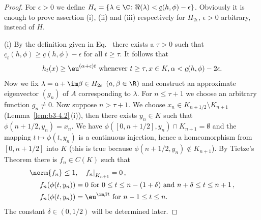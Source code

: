 \begin{proof}
	For $\epsilon > 0$ we define $H_{\epsilon} = \{\lambda \in \C \colon \Re(\lambda) < \underline{c}(h,\phi)-\epsilon\}$.
	Obviously it is enough to prove assertion (i), (ii) and (iii) respectively for $H_{2\epsilon}$, $\epsilon> 0$ arbitrary, instead of\/ $H$.

	(i) By the definition given in Eq.~ there exists a $\tau > 0$ such that $\underline{c}_{t}(h,\phi) \geq \underline{c}(h,\phi) - \epsilon$ for all $t \geq \tau$.
	It follows that
	\begin{equation}\label{eq:b3-4.5}
		h_{t}(x) \geq \eu^{(\alpha + \epsilon)t} \text{ whenever } t \geq \tau, x \in K, \alpha < \underline{c}(h,\phi)-2\epsilon .
	\end{equation}
	Now we fix $\lambda = a + \im\beta \in H_{2\epsilon}$ $(a,\beta \in \R)$ and construct an approximate eigenvector $(g_{n})$ of\/ $A$ 
    corresponding to $\lambda$.
	For $n \leq \tau + 1$ we choose an arbitrary function $g_{n} \neq 0$.
	Now suppose $n > \tau + 1$.
	We choose $x_{n} \in K_{n+1/2} \setminus K_{n+1}$ (\cf Lemma~\ref{lem:b3-4.2}\,(i)), then there exists $y_{n} \in K$ such that $\phi(n+1/2,y_{n}) = x_{n}$.
	We have $\phi([0,n+1/2],y_{n}) \cap K_{n+1} = \emptyset$ and the mapping $t \mapsto \phi(t,y_{n})$ is a continuous injection, hence a homeomorphism from $[0,n+1/2]$ into $K$ (this is true because $\phi(n+1/2,y_{n}) \notin K_{n+1}$).
	By Tietze's Theorem there is $f_{n} \in C(K)$ such that
	\begin{equation}\label{eq:b3-4.6}
		\begin{aligned}
			\norm{f_{n}} \leq 1 &, \quad {f_{n}|}_{K_{n+1}} = 0\,, \\
			f_{n}(\phi(t,y_{n})) &= 0 \text{ for } 0 \leq t \leq n-(1+\delta) \text{ and } n+\delta \leq t \leq n+1\,, \\
			f_{n}(\phi(t,y_{n})) &= \eu^{\im\beta  t} \text{ for } n-1 \leq t \leq n .
		\end{aligned}
	\end{equation}
	The constant $\delta \in (0,1/2)$ will be determined later.
	

\end{proof}

